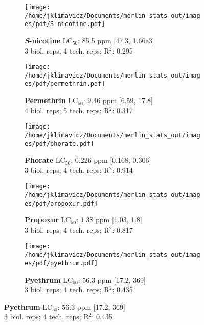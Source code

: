 \documentclass{article}
\begin{document}
\begin{figure}[thp!]
   \begin{subfigure}{0.500\textwidth}
      \centering
      \texttt{[image: /home/jklimavicz/Documents/merlin\_stats\_out/images/pdf/S-nicotine.pdf]}
      \vspace{-0.05cm}
      \caption*{\textbf{\textit{S}-nicotine} LC$_{50}$: 85.5 ppm [47.3, 1.66e3] \\ 
3 biol. reps; 4 tech. reps; R$^2$: 0.295}
      \vspace{0.1cm}
   \end{subfigure}%
   \begin{subfigure}{0.500\textwidth}
      \centering
      \texttt{[image: /home/jklimavicz/Documents/merlin\_stats\_out/images/pdf/permethrin.pdf]}
      \vspace{-0.05cm}
      \caption*{\textbf{Permethrin} LC$_{50}$: 9.46 ppm [6.59, 17.8] \\ 
4 biol. reps; 5 tech. reps; R$^2$: 0.317}
      \vspace{0.1cm}
   \end{subfigure}%
\vspace{-0.1cm}
   \begin{subfigure}{0.500\textwidth}
      \centering
      \texttt{[image: /home/jklimavicz/Documents/merlin\_stats\_out/images/pdf/phorate.pdf]}
      \vspace{-0.05cm}
      \caption*{\textbf{Phorate} LC$_{50}$: 0.226 ppm [0.168, 0.306] \\ 
3 biol. reps; 4 tech. reps; R$^2$: 0.914}
      \vspace{0.1cm}
   \end{subfigure}%
   \begin{subfigure}{0.500\textwidth}
      \centering
      \texttt{[image: /home/jklimavicz/Documents/merlin\_stats\_out/images/pdf/propoxur.pdf]}
      \vspace{-0.05cm}
      \caption*{\textbf{Propoxur} LC$_{50}$: 1.38 ppm [1.03, 1.8] \\ 
3 biol. reps; 4 tech. reps; R$^2$: 0.817}
      \vspace{0.1cm}
   \end{subfigure}%
\vspace{-0.1cm}
   \begin{subfigure}{0.500\textwidth}
      \centering
      \texttt{[image: /home/jklimavicz/Documents/merlin\_stats\_out/images/pdf/pyethrum.pdf]}
      \vspace{-0.05cm}
      \caption*{\textbf{Pyethrum} LC$_{50}$: 56.3 ppm [17.2, 369] \\ 
3 biol. reps; 4 tech. reps; R$^2$: 0.435}
      \vspace{0.1cm}
   \end{subfigure}%
\end{figure}
\pagebreak
\end{document}
